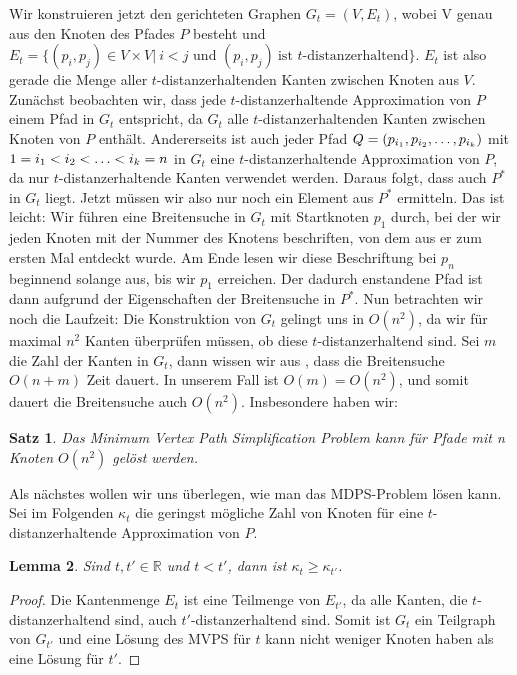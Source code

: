 \documentclass[11pt]{article}
\newcommand{\R}{\mathbb{R}}
\newtheorem{theorem}{Satz}[section]
\newtheorem{lemma}[theorem]{Lemma}
\begin{document}
    Wir konstruieren jetzt den gerichteten Graphen $G_t = (V,E_t)$, wobei V genau aus den Knoten des Pfades $P$ besteht und 
    $E_t = \{(p_i, p_j) \in V\times V|\ i < j \text{ und } (p_i,p_j)\ \text{ist $t$-distanzerhaltend}\}$. $E_t$ ist also gerade die Menge aller $t$-distanzerhaltenden Kanten zwischen Knoten aus $V$. Zunächst beobachten wir, dass jede $t$-distanzerhaltende Approximation von $P$ einem Pfad in $G_t$ entspricht, da $G_t$ alle $t$-distanzerhaltenden Kanten zwischen Knoten von $P$ enthält. Andererseits ist auch jeder Pfad $Q = (p_{i_1}, p_{i_2}, \mathellipsis, p_{i_k})$ mit $1 = i_1 < i_2 < \mathellipsis < i_k = n$ in $G_t$ eine $t$-distanzerhaltende Approximation von $P$, da nur $t$-distanzerhaltende Kanten verwendet werden. Daraus folgt, dass auch $P^*$ in $G_t$ liegt. Jetzt müssen wir also nur noch ein Element aus $P^*$ ermitteln. Das ist leicht: Wir führen eine Breitensuche in $G_t$ mit Startknoten $p_1$ durch, bei der wir jeden Knoten mit der Nummer des Knotens beschriften, von dem aus er zum ersten Mal entdeckt wurde. Am Ende lesen wir diese Beschriftung bei $p_n$ beginnend solange aus, bis wir $p_1$ erreichen. Der dadurch enstandene Pfad ist dann aufgrund der Eigenschaften der Breitensuche in $P^*$. 
    Nun betrachten wir noch die Laufzeit: Die Konstruktion von $G_t$ gelingt uns in $O(n^2)$, da wir für maximal $n^2$ Kanten überprüfen müssen, ob diese $t$-distanzerhaltend sind. Sei $m$ die Zahl der Kanten in $G_t$, dann wissen wir aus  \cite{hagerup}, dass die Breitensuche $O(n+m)$ Zeit dauert. In unserem Fall ist $O(m) = O(n^2)$, und somit dauert die Breitensuche auch $O(n^2)$. Insbesondere haben wir:
    \begin{theorem}
    	Das Minimum Vertex Path Simplification Problem kann für Pfade mit n Knoten $O(n^2)$ gelöst werden.
    \end{theorem} 
    
    Als nächstes wollen wir uns überlegen, wie man das MDPS-Problem lösen kann. Sei im Folgenden $\kappa_t$ die geringst mögliche Zahl von Knoten für eine $t$-distanzerhaltende Approximation von $P$.
	\begin{lemma}
		Sind $t, t' \in \R$ und $t < t'$, dann ist $\kappa_t \geq \kappa_{t'}$.
	\end{lemma}
	\begin{proof}
		Die Kantenmenge $E_t$ ist eine Teilmenge von $E_{t'}$, da alle Kanten, die $t$-distanzerhaltend sind, auch $t'$-distanzerhaltend sind. Somit ist $G_t$ ein Teilgraph von $G_{t'}$ und eine Lösung des MVPS für $t$ kann nicht weniger Knoten haben als eine Lösung für $t'$.
	\end{proof}
	
\end{document}

